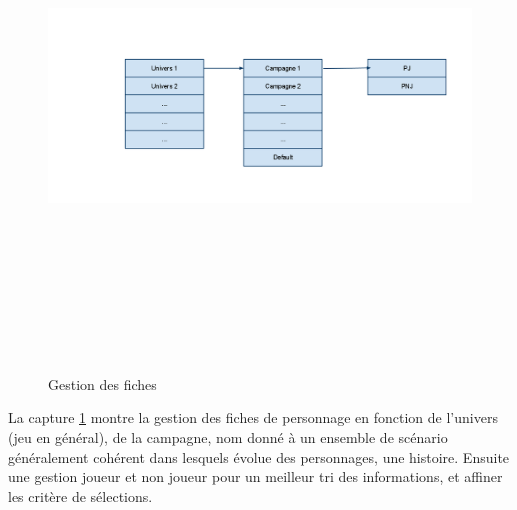 \documentclass[11pt,a4paper]{article}
\begin{document}
\begin{figure}[h]
  	
  		\includegraphics[height=14cm,width=15cm]{image/screen3.png}
  		\caption{Gestion des fiches}
  		\label{screen3}
\end{figure}

La capture \ref{screen3} montre la gestion des fiches de personnage en fonction de l'univers (jeu en général), de 
la campagne, nom donné à un ensemble de scénario généralement cohérent dans lesquels évolue des personnages, une histoire. 
Ensuite une gestion joueur et non joueur pour un meilleur tri des informations, et affiner les critère de sélections.
\end{document}
